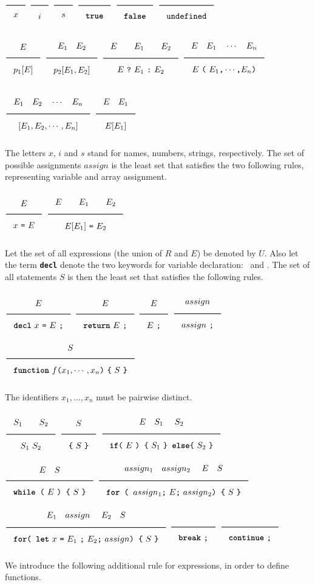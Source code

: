 $\Rule{}{x}$
\hfill 
$\Rule{}{i}$
\hfill 
$\Rule{}{s}$
\hfill 
$\Rule{}{\TruE}$
\hfill 
$\Rule{}{\FalsE}$
\hfill 
$\Rule{}{\Undefined}$

$\Rule{E}{p_1[E]}$
\hfill
$\Rule{E_1\quad E_2}{p_2[E_1, E_2]}$
\hfill
$\Rule{E \qquad E_1 \qquad E_2}{E\ \texttt{?}\ E_1\ \texttt{:}\ E_2}$
\hfill
$\Rule{E\quad E_1\quad \cdots \quad E_n}{E\ \Lp\ E_1\texttt{,}\cdots\texttt{,} E_n\Rp}$

$\Rule{E_1\quad E_2\quad \cdots \quad E_n}{[E_1, E_2, \cdots, E_n]}$
\hfill
$\Rule{E\quad E_1}{E[E_1]}$

The letters $x$, $i$ and $s$ stand for names, numbers, strings, respectively.
The set of possible assignments $assign$ is the least set that satisfies the two following rules, 
representing variable and array assignment.

$\Rule{E}{x\ \texttt{=}\ E}$
\hfill
$\Rule{E \qquad E_1 \qquad E_2}{E[E_1]\ \texttt{=}\ E_2}$

\noindent
Let the set of all expressions (the union of $R$ and $E$) be denoted by $U$. Also let the term
\textbf{\texttt{decl}} denote the two keywords for variable declaration: \Let \ and \Const .
The set of all statements $S$ is then
the least set that satisfies the
following rules. 

$\Rule{E}{\textbf{\texttt{decl}} \ x\ \texttt{=}\ E\ \texttt{;}}$
\hfill
$\Rule{E}{\Return\ E\ \texttt{;}}$
\hfill
$\Rule{E}{E\ \texttt{;}}$
\hfill
$\Rule{assign}{assign\ \texttt{;}}$
\hfill
$\Rule{S}{\Fun\ f \Lp x_1,\cdots, x_n\Rp\ \Lc\ S\ \Rc}$

\noindent
The identifiers $x_1,\ldots,x_n$ must be pairwise distinct.

$\Rule{S_1 \qquad S_2}{S_1\ S_2}$
\hfill
$\Rule{S}{\Lc\ S\ \Rc}$
\hfill
$\Rule{E \quad S_1\ \quad S_2}{\texttt{\If (}\ E \ \texttt{) \{}\ S_1\ \texttt{\} \Else \{}\ S_2\ \texttt{\}}}$
\hfill
$\Rule{E \quad S}{\textbf{\texttt{while}}\texttt{ (}\ E \ \texttt{) \{}\ S\ \texttt{\}}}$
\hfill
$\Rule{assign_1 \quad assign_2\ \quad E \quad S}{\textbf{\texttt{for}} \texttt{ ( }assign_1\texttt{;}\ E\texttt{;}\ assign_2 \texttt{) \{}\ S\ \texttt{\}}}$
\hfill
$\Rule{E_1 \quad assign\ \quad E_2 \quad S}{\textbf{\texttt{for}} \texttt{( \Let }\  x\ \texttt{=}\ E_1\ \texttt{;}\ E_2\texttt{;}\ assign \texttt{) \{}\ S\ \texttt{\}}}$
\hfill
$\Rule{}{\textbf{\texttt{break}}\ \texttt{;}}$
\hfill
$\Rule{}{\textbf{\texttt{continue}}\ \texttt{;}}$

\noindent
We introduce the following additional rule for expressions, in order
to define functions.

